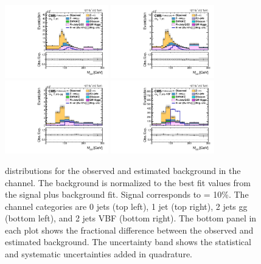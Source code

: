 \begin{figure}[htbp!]
  \centering
  \includegraphics[width=0.4\textwidth]{plots/chapter9/CB/etau/0jet.pdf}
  \includegraphics[width=0.4\textwidth]{plots/chapter9/CB/etau/1jet.pdf} \\
  \includegraphics[width=0.4\textwidth]{plots/chapter9/CB/etau/2jet_gg.pdf}
  \includegraphics[width=0.4\textwidth]{plots/chapter9/CB/etau/2jet_vbf.pdf} \\
  \caption{\mcol distributions for the observed and estimated background in the \ehad channel. The background is normalized to the best fit values from the signal plus background fit. Signal corresponds to \BHet = 10\%. The \ehad channel categories are 0 jets (top left), 1 jet (top right), 2 jets gg (bottom left), and 2 jets VBF (bottom right). The bottom panel in each plot shows the fractional difference between the observed and estimated background. The uncertainty band shows the statistical and systematic uncertainties added in quadrature.}
  \label{fig:mcol_ehad}
\end{figure}

